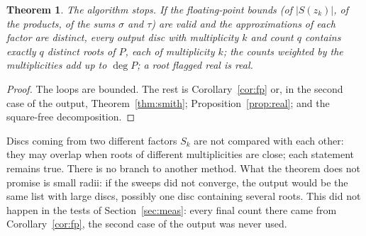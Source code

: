 \documentclass[10pt,a4paper]{article}
\newtheorem{theorem}{Theorem}[section]
\theoremstyle{definition}
\numberwithin{equation}{section}
\begin{document}
\begin{theorem}\label{thm:g8}
The algorithm stops. If the floating-point bounds (of $|S(z_k)|$, of the products, of the sums
$\sigma$ and $\tau$) are valid and the approximations of each factor are
distinct, every output disc with multiplicity $k$ and count $q$ contains exactly $q$ distinct roots
of $P$, each of multiplicity $k$; the counts weighted by the multiplicities add up to $\deg P$; a
root flagged real is real.
\end{theorem}
\begin{proof}
The loops are bounded. The rest is Corollary~\ref{cor:fp} or, in the second case of the output,
Theorem~\ref{thm:smith}; Proposition~\ref{prop:real}; and the square-free decomposition.
\end{proof}
Discs coming from two different factors $S_k$ are not compared with each other: they may overlap when
roots of different multiplicities are close; each statement remains true.
There is no branch to another method. What the theorem does not promise is small radii: if the
sweeps did not converge, the output would be the same list with large discs, possibly one disc
containing several roots. This did not happen in the tests of Section~\ref{sec:meas}: every final
count there came from Corollary~\ref{cor:fp}, the second case of the output was never used.
\end{document}
